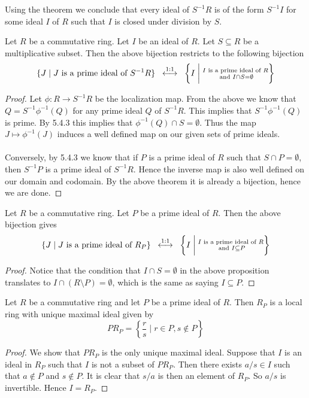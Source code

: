 \documentclass[a4paper]{article}
\begin{document}
Using the theorem we conclude that every ideal of $S^{-1}R$ is of the form $S^{-1}I$ for some ideal $I$ of $R$ such that $I$ is closed under division by $S$. 

\begin{prp}{}{} Let $R$ be a commutative ring. Let $I$ be an ideal of $R$. Let $S\subseteq R$ be a multiplicative subset. Then the above bijection restricts to the following bijection $$\{J\;|\;J\text{ is a prime ideal of }S^{-1}R\}\;\;\overset{1:1}{\longleftrightarrow}\;\;\left\{I\;\bigg{|}\;\substack{I\text{ is a prime ideal of }R\\\text{ and }I\cap S=\emptyset}\right\}$$ \tcbline
\begin{proof}
Let $\phi:R\to S^{-1}R$ be the localization map. From the above we know that $Q=S^{-1}\phi^{-1}(Q)$ for any prime ideal $Q$ of $S^{-1}R$. This implies that $S^{-1}\phi^{-1}(Q)$ is prime. By 5.4.3 this implies that $\phi^{-1}(Q)\cap S=\emptyset$. Thus the map $J\mapsto\phi^{-1}(J)$ induces a well defined map on our given sets of prime ideals. \\~\\

Conversely, by 5.4.3 we know that if $P$ is a prime ideal of $R$ such that $S\cap P=\emptyset$, then $S^{-1}P$ is a prime ideal of $S^{-1}R$. Hence the inverse map is also well defined on our domain and codomain. By the above theorem it is already a bijection, hence we are done. 
\end{proof}
\end{prp}

\begin{prp}{}{} Let $R$ be a commutative ring. Let $P$ be a prime ideal of $R$. Then the above bijection gives $$\{J\;|\;J\text{ is a prime ideal of }R_P\}\;\;\overset{1:1}{\longleftrightarrow}\;\;\left\{I\;\bigg{|}\;\substack{I\text{ is a prime ideal of }R\\\text{ and }I\subseteq P}\right\}$$ \tcbline
\begin{proof}
Notice that the condition that $I\cap S=\emptyset$ in the above proposition translates to $I\cap (R\setminus P)=\emptyset$, which is the same as saying $I\subseteq P$. 
\end{proof}
\end{prp}

\begin{prp}{}{} Let $R$ be a commutative ring and let $P$ be a prime ideal of $R$. Then $R_P$ is a local ring with unique maximal ideal given by $$PR_P=\left\{\frac{r}{s}\;|\;r\in P,s\notin P\right\}$$ \tcbline
\begin{proof}
We show that $PR_P$ is the only unique maximal ideal. Suppose that $I$ is an ideal in $R_P$ such that $I$ is not a subset of $PR_P$. Then there exists $a/s\in I$ such that $a\notin P$ and $s\notin P$. It is clear that $s/a$ is then an element of $R_P$. So $a/s$ is invertible. Hence $I=R_P$. 
\end{proof}
\end{prp}
\end{document}

